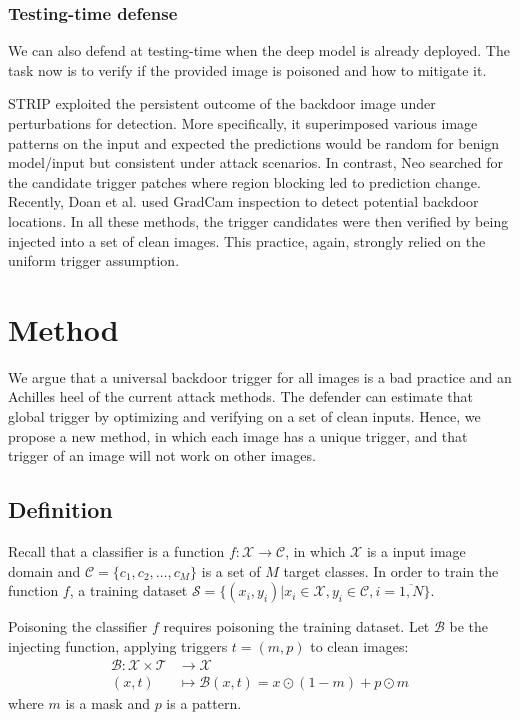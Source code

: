 \documentclass{article}
\begin{document}
\subsubsection{Testing-time defense} We can also defend at testing-time when the deep model is already deployed. The task now is to verify if the provided image is poisoned and how to mitigate it.

STRIP \cite{gao2019strip} exploited the persistent outcome of the backdoor image under perturbations for detection. More specifically, it superimposed various image patterns on the input and expected the predictions would be random for benign model/input but consistent under attack scenarios. In contrast, Neo \cite{udeshi2019model} searched for the candidate trigger patches where region blocking led to prediction change. Recently, Doan et al. \cite{Doan2019Aug} used GradCam inspection to detect potential backdoor locations. In all these methods, the trigger candidates were then verified by being injected into a set of clean images. This practice, again, strongly relied on the uniform trigger assumption.

\section{Method}
We argue that a universal backdoor trigger for all images is a bad practice and an Achilles heel of the current attack methods. The defender can estimate that global trigger by optimizing and verifying on a set of clean inputs. Hence, we propose a new method, in which each image has a unique trigger, and that trigger of an image will not work on other images.
\subsection{Definition}
    Recall that a classifier is a function $f: \mathcal{X} \rightarrow \mathcal{C}$, in which $\mathcal{X}$ is a input image domain and $\mathcal{C}=\{c_1, c_2, \dots, c_M\}$ is a set of $M$ target classes. In order to train the function $f$, a training dataset $\mathcal{S}=\{(x_i, y_i)|x_i \in \mathcal{X}, y_i\in\mathcal{C}, i=\overline{1,N}\}$.  
    
    Poisoning the classifier $f$ requires poisoning the training dataset. Let $\mathcal{B}$ be the injecting function, applying triggers $t=(m, p)$ to clean images:
    \begin{align*}
       \mathcal{B}: \mathcal{X}\times\mathcal{T}&\longrightarrow\mathcal{X}\\
    (x, t) &\longmapsto \mathcal{B}(x, t) = x \odot (1-m) + p \odot m 
    \end{align*}
    where $m$ is a mask and $p$ is a pattern. 
    
\end{document}
